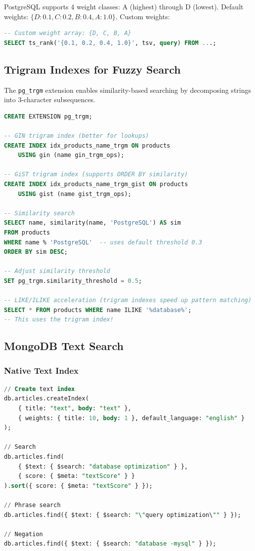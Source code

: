 \documentclass[12pt,a4paper]{article}
\begin{document}
PostgreSQL supports 4 weight classes: A (highest) through D (lowest). Default weights: $\{D: 0.1, C: 0.2, B: 0.4, A: 1.0\}$. Custom weights:

\begin{lstlisting}[language=SQL]
-- Custom weight array: {D, C, B, A}
SELECT ts_rank('{0.1, 0.2, 0.4, 1.0}', tsv, query) FROM ...;
\end{lstlisting}

\subsection{Trigram Indexes for Fuzzy Search}

The \texttt{pg\_trgm} extension enables similarity-based searching by decomposing strings into 3-character subsequences.

\begin{lstlisting}[language=SQL, caption={Trigram fuzzy search}]
CREATE EXTENSION pg_trgm;

-- GIN trigram index (better for lookups)
CREATE INDEX idx_products_name_trgm ON products
    USING gin (name gin_trgm_ops);

-- GiST trigram index (supports ORDER BY similarity)
CREATE INDEX idx_products_name_trgm_gist ON products
    USING gist (name gist_trgm_ops);

-- Similarity search
SELECT name, similarity(name, 'PostgreSQL') AS sim
FROM products
WHERE name % 'PostgreSQL'  -- uses default threshold 0.3
ORDER BY sim DESC;

-- Adjust similarity threshold
SET pg_trgm.similarity_threshold = 0.5;

-- LIKE/ILIKE acceleration (trigram indexes speed up pattern matching)
SELECT * FROM products WHERE name ILIKE '%database%';
-- This uses the trigram index!
\end{lstlisting}

\subsection{MongoDB Text Search}

\subsubsection{Native Text Index}

\begin{lstlisting}[language=SQL, caption={MongoDB text search}]
// Create text index
db.articles.createIndex(
    { title: "text", body: "text" },
    { weights: { title: 10, body: 1 }, default_language: "english" }
);

// Search
db.articles.find(
    { $text: { $search: "database optimization" } },
    { score: { $meta: "textScore" } }
).sort({ score: { $meta: "textScore" } });

// Phrase search
db.articles.find({ $text: { $search: "\"query optimization\"" } });

// Negation
db.articles.find({ $text: { $search: "database -mysql" } });
\end{lstlisting}
\end{document}

